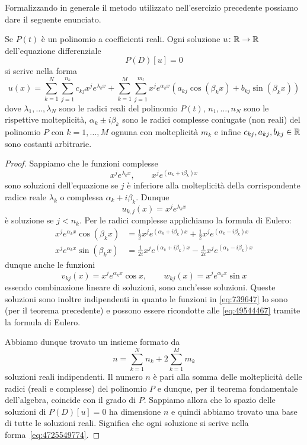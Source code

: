 Formalizzando in generale
il metodo utilizzato nell'esercizio precedente possiamo
dare il seguente enunciato.

\begin{theorem}
\mymark{**}%
Se $P(t)$ è un polinomio a coefficienti reali.
Ogni soluzione
$u\colon \mathbb R\to \mathbb R$ dell'equazione differenziale
\[
  P(D) [u] = 0
\]
si scrive nella forma
\begin{equation}
\label{eq:4725549774}
  u(x) = \sum_{k=1}^N \sum_{j=1}^{n_k} c_{kj} x^j e^{\lambda_k x}
        + \sum_{k=1}^M \sum_{j=1}^{m_l} x^j e^{\alpha_k x} (a_{kj} \cos(\beta_k x) + b_{kj}\sin(\beta_k x))
\end{equation}
dove $\lambda_1, \dots, \lambda_N$ sono le radici reali del polinomio $P(t)$, $n_1, \dots, n_N$ sono le rispettive molteplicità,
$\alpha_k \pm i \beta_k$ sono le radici complesse coniugate (non reali) del polinomio $P$ con $k=1,\dots, M$ ognuna con molteplicità $m_k$ e infine $c_{kj}, a_{kj}, b_{kj}\in \mathbb R$ sono costanti arbitrarie.
\end{theorem}
%
\begin{proof}
Sappiamo che le funzioni complesse
\begin{equation}\label{eq:739647}
  x^j e^{\lambda_k x}, \qquad
  x^j e^{(\alpha_k+i\beta_k)x}
\end{equation}
sono soluzioni dell'equazione se $j$ è inferiore alla molteplicità della corrispondente radice reale $\lambda_k$ o complessa $\alpha_k + i \beta_k$.
Dunque
\[
  u_{k,j}(x) = x^j e^{\lambda_k x}
\]
è soluzione se $j<n_k$.
Per le radici complesse applichiamo la formula di Eulero:
\begin{align}\label{eq:49544467}
x^j e^{\alpha_k x}\cos (\beta_k x) &=
  \frac 1 2 x^j e^{(\alpha_k +i \beta_k)x}
  + \frac 1 2 x^j e^{(\alpha_k - i \beta_k)x}\\
x^j e^{\alpha_k x}\sin (\beta_k x) &=
    \frac 1 {2i} x^j e^{(\alpha_k +i \beta_k)x}
    - \frac 1 {2i} x^j e^{(\alpha_k - i \beta_k)x}
\end{align}
dunque anche le funzioni
\[
  v_{kj}(x) = x^j e^{\alpha_k x}\cos x, \qquad
  w_{kj}(x) = x^j e^{\alpha_k x}\sin x
\]
essendo combinazione lineare di soluzioni, sono anch'esse
soluzioni.
Queste soluzioni sono inoltre indipendenti in quanto
le funzioni in \eqref{eq:739647} lo sono (per il teorema precedente) e possono essere ricondotte alle \eqref{eq:49544467}
tramite la formula di Eulero.

Abbiamo dunque trovato un insieme formato da
\[
  n = \sum_{k=1}^N n_k + 2 \sum_{k=1}^M m_k
\]
soluzioni reali indipendenti. Il numero $n$ è pari alla somma delle molteplicità delle radici (reali e complesse) del polinomio $P$ e dunque, per il teorema fondamentale dell'algebra, coincide con il grado di $P$. Sappiamo allora che lo spazio delle soluzioni di $P(D)[u]=0$ ha dimensione $n$ e quindi abbiamo trovato una base di tutte le soluzioni reali. Significa che ogni soluzione si scrive nella forma~\eqref{eq:4725549774}.
\end{proof}

